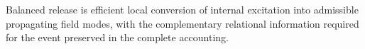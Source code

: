 \setcounter{theorem}{0}
\begin{definition}
Balanced release is efficient local conversion of internal excitation into admissible propagating field modes, with the complementary relational information required for the event preserved in the complete accounting.
\end{definition}
